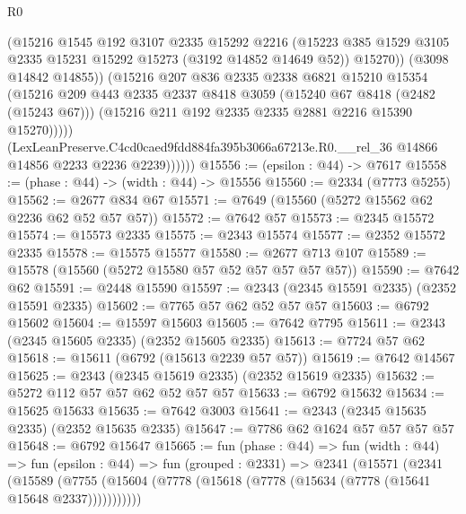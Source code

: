 \begin{lexlean}{R0}
\begin{coremodule}
                      (@15216
                        @1545
                        @192
                        @3107
                        @2335
                        @15292
                        @2216
                        (@15223
                          @385
                          @1529
                          @3105
                          @2335
                          @15231
                          @15292
                          @15273
                          (@3192 @14852 @14649 @52))
                        @15270))
                    (@3098 @14842 @14855))
                  (@15216
                    @207
                    @836
                    @2335
                    @2338
                    @6821
                    @15210
                    @15354
                    (@15216
                      @209
                      @443
                      @2335
                      @2337
                      @8418
                      @3059
                      (@15240 @67 @8418 (@2482 (@15243 @67)))
                      (@15216 @211 @192 @2335 @2335 @2881 @2216 @15390 @15270)))))
              (LexLeanPreserve.C4cd0caed9fdd884fa395b3066a67213e.R0.__rel_36
                @14866
                @14856
                @2233
                @2236
                @2239))))))
@15556 := (epsilon : @44) -> @7617
@15558 := (phase : @44) -> (width : @44) -> @15556
@15560 := @2334 (@7773 @5255)
@15562 := @2677 @834 @67
@15571 := @7649 (@15560 (@5272 @15562 @62 @2236 @62 @52 @57 @57))
@15572 := @7642 @57
@15573 := @2345 @15572
@15574 := @15573 @2335
@15575 := @2343 @15574
@15577 := @2352 @15572 @2335
@15578 := @15575 @15577
@15580 := @2677 @713 @107
@15589 := @15578 (@15560 (@5272 @15580 @57 @52 @57 @57 @57 @57))
@15590 := @7642 @62
@15591 := @2448 @15590
@15597 := @2343 (@2345 @15591 @2335) (@2352 @15591 @2335)
@15602 := @7765 @57 @62 @52 @57 @57
@15603 := @6792 @15602
@15604 := @15597 @15603
@15605 := @7642 @7795
@15611 := @2343 (@2345 @15605 @2335) (@2352 @15605 @2335)
@15613 := @7724 @57 @62
@15618 := @15611 (@6792 (@15613 @2239 @57 @57))
@15619 := @7642 @14567
@15625 := @2343 (@2345 @15619 @2335) (@2352 @15619 @2335)
@15632 := @5272 @112 @57 @57 @62 @52 @57 @57
@15633 := @6792 @15632
@15634 := @15625 @15633
@15635 := @7642 @3003
@15641 := @2343 (@2345 @15635 @2335) (@2352 @15635 @2335)
@15647 := @7786 @62 @1624 @57 @57 @57 @57
@15648 := @6792 @15647
@15665 := fun (phase : @44) =>
  fun (width : @44) =>
  fun (epsilon : @44) =>
  fun (grouped : @2331) =>
  @2341
    (@15571
      (@2341
        (@15589 (@7755 (@15604 (@7778 (@15618 (@7778 (@15634 (@7778 (@15641 @15648 @2337)))))))))))

\end{coremodule}
\end{lexlean}
